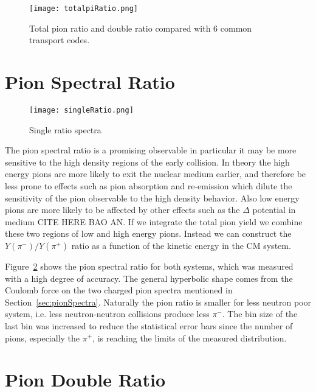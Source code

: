 \begin{figure}[!htb]
\centering
\texttt{[image: totalpiRatio.png]}
\caption{Total pion ratio and double ratio compared with 6 common transport codes.}
\label{fig:totalpiRatio}
\end{figure}



\section{Pion Spectral Ratio}


\begin{figure}[!htb]
\centering
\texttt{[image: singleRatio.png]}
\caption{Single ratio spectra}
\label{fig:SRspectra}
\end{figure}

The pion spectral ratio is a promising observable in particular it may be more sensitive to the high density regions of the early collision. In theory the high energy pions are more likely to exit the nuclear medium earlier, and therefore be less prone to effects such as pion absorption and re-emission which dilute the sensitivity of the pion observable to the high density behavior. Also low energy pions are more likely to be affected by other effects such as the $\Delta$ potential in medium CITE HERE BAO AN. If we integrate the total pion yield we combine these two regions of low and high energy pions. Instead we can construct the $Y(\pi^-)/Y(\pi^+)$ ratio as a function of the kinetic energy in the CM system. 


Figure~\ref{fig:SRspectra} shows the pion spectral ratio for both systems, which was measured with a high degree of accuracy. The general hyperbolic shape comes from the Coulomb force on the two charged pion spectra mentioned in Section~\ref{sec:pionSpectra}. Naturally the pion ratio is smaller for less neutron poor system, i.e. less neutron-neutron collisions produce less $\pi^-$. The bin size of the last bin was increased to reduce the statistical error bars since the number of pions, especially the $\pi^+$, is reaching the limits of the measured distribution. 




\section{Pion Double Ratio}

